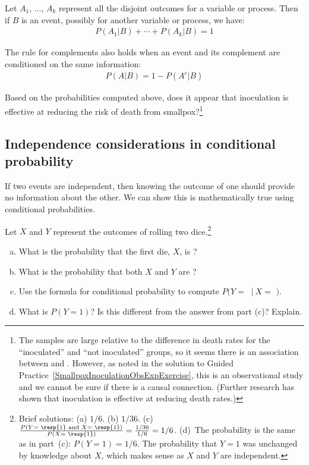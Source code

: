 \begin{termBox}{
Let $A_1$, ..., $A_k$ represent all the disjoint outcomes for a variable or process. Then if $B$ is an event, possibly for another variable or process, we have: \vspace{-1mm}
\begin{eqnarray*}
P(A_1|B)+\cdots+P(A_k|B) = 1
\end{eqnarray*}\vspace{-5.5mm} \par
The rule for complements also holds when an event and its complement are conditioned on the same information: \vspace{-1.5mm}
\begin{eqnarray*}
P(A | B) = 1 - P(A^c | B)
\end{eqnarray*}}
\end{termBox}

\begin{exercise}
Based on the probabilities computed above, does it appear that inoculation is effective at reducing the risk of death from smallpox?\footnote{The samples are large relative to the difference in death rates for the ``inoculated'' and ``not inoculated'' groups, so it seems there is an association between  and . However, as noted in the solution to Guided Practice~\ref{SmallpoxInoculationObsExpExercise}, this is an observational study and we cannot be sure if there is a causal connection. (Further research has shown that inoculation is effective at reducing death rates.)}
\end{exercise}

\subsection{Independence considerations in conditional probability}

If two events are independent, then knowing the outcome of one should provide no information about the other. We can show this is mathematically true using conditional probabilities.

\begin{exercise} \label{condProbOfRollingA1AfterOne1}
Let $X$ and $Y$ represent the outcomes of rolling two dice.\footnote{Brief solutions: (a) $1/6$. (b) $1/36$. (c)~$\frac{P(Y = \text{ \resp{1} and }X=\text{ \resp{1}})}{P(X=\text{ \resp{1}})} = \frac{1/36}{1/6} = 1/6$. (d)~The probability is the same as in part~(c): $P(Y=1)=1/6$. The probability that $Y=1$ was unchanged by knowledge about $X$, which makes sense as $X$ and $Y$ are independent.}
\begin{enumerate}[(a)]
\item What is the probability that the first die, $X$, is ?
\item What is the probability that both $X$ and $Y$ are ?
\item Use the formula for conditional probability to compute $P(Y =$ $\ |\ X = $ $)$.
\item What is $P(Y=1)$? Is this different from the answer from part (c)? Explain.
\end{enumerate}
\end{exercise}

